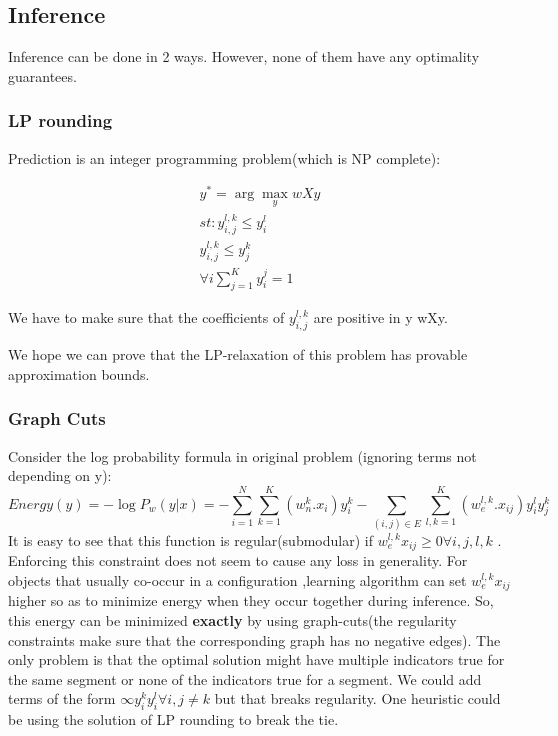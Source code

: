 \documentclass[11pt,a4paper,oneside]{report}
\begin{document}
\subsection{Inference}
Inference can be done in 2 ways. However, none of them have any optimality guarantees.

\subsubsection{LP rounding}
Prediction is an integer programming problem(which is NP complete):


\begin{eqnarray*}
y^*=\arg \max _y wXy\\
st: y_{i,j}^{l,k}\le y_i^l\\
y_{i,j}^{l,k}\le y_j^k\\
\forall i \sum_{j=1}^{K} y_i^j = 1
\end{eqnarray*}
 
We have to make sure that the coefficients of $y_{i,j}^{l,k}$ are positive in  y wXy.

We hope we can prove that the LP-relaxation of this problem has provable approximation bounds.

\subsubsection{Graph Cuts}
Consider the log probability formula in original problem (ignoring terms not depending on y):
\begin{equation}
Energy(y)= -\log P_w (y|x) = -\sum_{i=1}^{N} \sum_{k=1}^{K} (w^{k}_{n}.x_{i})y_{i}^{k} - \sum_{(i,j)\in E} \sum_{l,k=1}^{K} (w_{e}^{l,k}.x_{ij})y_i^l y_j^k
\end{equation}
It is easy to see that this function is regular(submodular) if $w_e^{l,k}x_{ij} \ge 0 \forall i,j,l,k$ . Enforcing this constraint does not seem to cause any loss in generality. For objects that usually co-occur in a configuration ,learning algorithm can set $w_e^{l,k}x_{ij}$ higher so as to minimize energy when they occur together during inference. So, this energy can be minimized {\bf exactly} by using graph-cuts(the regularity constraints make sure that the corresponding graph has no negative edges). The only problem is that the optimal solution might have multiple indicators true for the same segment or none of the indicators true for a segment. We could add terms of the form $\infty y_i^ky_i^l \forall i, j\neq k$ but that breaks regularity. 
 One heuristic could  be using the solution of LP rounding  to break the tie.
\end{document}
